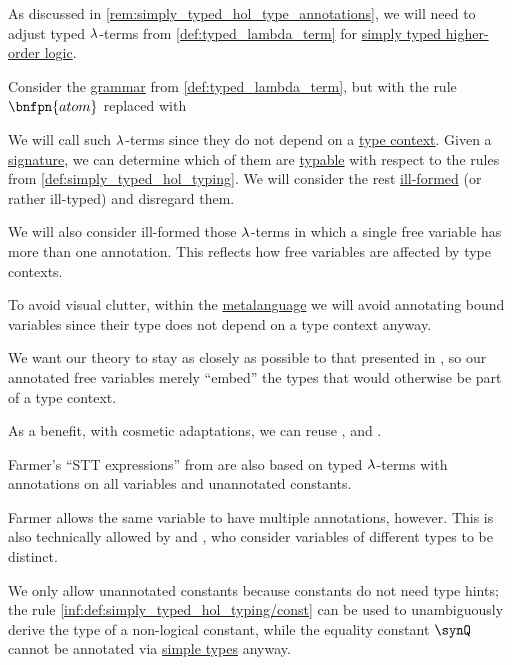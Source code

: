 \begin{definition}\label{def:freely_typed_lambda_term}\mimprovised
  As discussed in \cref{rem:simply_typed_hol_type_annotations}, we will need to adjust typed \( {\mathrm \lambda} \)-terms from \cref{def:typed_lambda_term} for \hyperref[def:simply_typed_hol]{simply typed higher-order logic}.

  Consider the \hyperref[def:formal_grammar]{grammar} from \cref{def:typed_lambda_term}, but with the rule \( \bnfpn{atom} \) replaced with
  \begin{bnf*}
                   { \bnfor {}}
  \end{bnf*}

  We will call such \( {\mathrm \lambda} \)-terms  since they do not depend on a \hyperref[def:type_context]{type context}. Given a \hyperref[def:simply_typed_hol_signature]{signature}, we can determine which of them are \hyperref[def:typability]{typable} with respect to the rules from \cref{def:simply_typed_hol_typing}. We will consider the rest \hyperref[con:expression]{ill-formed} (or rather ill-typed) and disregard them.

  We will also consider ill-formed those \( {\mathrm \lambda} \)-terms in which a single free variable has more than one annotation. This reflects how free variables are affected by type contexts.

  To avoid visual clutter, within the \hyperref[con:metalingual_abbreviation]{metalanguage} we will avoid annotating bound variables since their type does not depend on a type context anyway.
\end{definition}
\begin{comments}
  \item We want our theory to stay as closely as possible to that presented in , so our annotated free variables merely \enquote{embed} the types that would otherwise be part of a type context.

  As a benefit, with cosmetic adaptations, we can reuse ,  and .

  \item Farmer's \enquote{STT expressions} from \cite[270]{Farmer2008STTVirtues} are also based on typed \( {\mathrm \lambda} \)-terms with annotations on all variables and unannotated constants.

  Farmer allows the same variable to have multiple annotations, however. This is also technically allowed by  and , who consider variables of different types to be distinct.

  \item We only allow unannotated constants because constants do not need type hints; the rule \ref{inf:def:simply_typed_hol_typing/const} can be used to unambiguously derive the type of a non-logical constant, while the equality constant \( \synQ \) cannot be annotated via \hyperref[def:simple_type]{simple types} anyway.
\end{comments}

